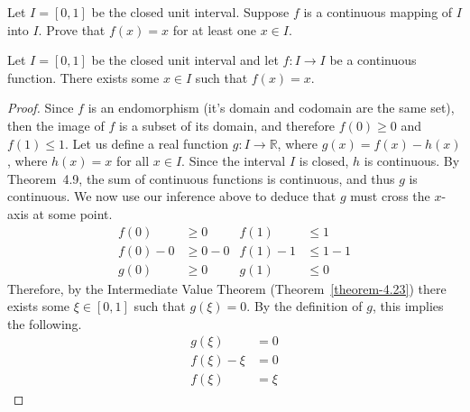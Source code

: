 \begin{exercise}
	Let $I = \left[ 0, 1 \right]$ be the closed unit interval. Suppose $f$ is a continuous mapping of $I$ into $I$. Prove that $f(x) = x$ for at least one $x \in I$.
\end{exercise}
\begin{proposition}
	Let $I = \left[ 0, 1\right]$ be the closed unit interval and let $f : I \to I$ be a continuous function. There exists some $x \in I$ such that $f(x) = x$.
\end{proposition}
\begin{proof}
	Since $f$ is an endomorphism (it's domain and codomain are the same set), then the image of $f$ is a subset of its domain, and therefore $f\left(0\right) \geq 0$ and $f\left(1\right) \leq 1$.
	\newline\newline
	Let us define a real function $g : I \to \mathbb{R}$, where $g\left(x\right) = f\left(x\right) - h\left(x\right)$, where $h\left(x\right) = x$ for all $x \in I$. Since the interval $I$ is closed, $h$ is continuous. By Theorem~4.9, the sum of continuous functions is continuous, and thus $g$ is continuous.
	\newline\newline	
	We now use our inference above to deduce that $g$ must cross the $x$-axis at some point.
	\begin{align*}
	f\left(0\right) &\geq 0 & f\left(1\right) &\leq 1 \\
	f\left(0\right) - 0 &\geq 0 - 0 & f\left(1\right) - 1 &\leq 1 - 1 \\
	g\left(0\right) &\geq 0 & g\left(1\right) &\leq 0
	\end{align*}
	Therefore, by the Intermediate Value Theorem (Theorem~\ref{theorem-4.23}) there exists some $\xi \in \left[ 0, 1 \right]$ such that $g\left(\xi\right) = 0$. By the definition of $g$, this implies the following.
	\begin{align*}
	g\left(\xi\right) &= 0 \\
	f\left(\xi\right) - \xi &= 0 \\
	f\left(\xi\right) &= \xi
	\end{align*}
\end{proof}
